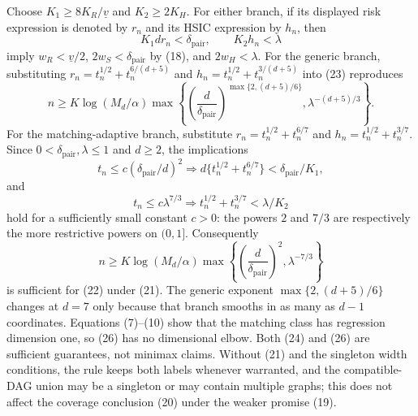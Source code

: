 Choose \(K_1\ge8K_R/\underline v\) and \(K_2\ge2K_H\). For either branch, if its displayed risk expression is denoted by \(r_n\) and its HSIC expression by \(h_n\), then
\[
 K_1d r_n<\delta_{\mathrm{pair}},
 \qquad K_2h_n<\lambda \tag{23}
\]
imply \(w_R<\underline v/2\), \(2w_S<\delta_{\mathrm{pair}}\) by (18), and \(2w_H<\lambda\). For the generic branch, substituting \(r_n=t_n^{1/2}+t_n^{6/(d+5)}\) and \(h_n=t_n^{1/2}+t_n^{3/(d+5)}\) into (23) reproduces
\[
 n\ge K\log(M_d/\alpha)
 \max\left\{
 \left(\frac d{\delta_{\mathrm{pair}}}\right)^{\max\{2,(d+5)/6\}},
 \lambda^{-(d+5)/3}
 \right\}. \tag{24}
\]
For the matching-adaptive branch, substitute \(r_n=t_n^{1/2}+t_n^{6/7}\) and \(h_n=t_n^{1/2}+t_n^{3/7}\). Since \(0<\delta_{\mathrm{pair}},\lambda\le1\) and \(d\ge2\), the implications
\[
 t_n\le c(\delta_{\mathrm{pair}}/d)^2
 \Longrightarrow d\{t_n^{1/2}+t_n^{6/7}\}<\delta_{\mathrm{pair}}/K_1,
\]
and
\[
 t_n\le c\lambda^{7/3}
 \Longrightarrow t_n^{1/2}+t_n^{3/7}<\lambda/K_2 \tag{25}
\]
hold for a sufficiently small constant \(c>0\): the powers \(2\) and \(7/3\) are respectively the more restrictive powers on \((0,1]\). Consequently
\[
 n\ge K\log(M_d/\alpha)
 \max\left\{
 \left(\frac d{\delta_{\mathrm{pair}}}\right)^2,
 \lambda^{-7/3}
 \right\} \tag{26}
\]
is sufficient for (22) under (21). The generic exponent \(\max\{2,(d+5)/6\}\) changes at \(d=7\) only because that branch smooths in as many as \(d-1\) coordinates. Equations (7)--(10) show that the matching class has regression dimension one, so (26) has no dimensional elbow. Both (24) and (26) are sufficient guarantees, not minimax claims. Without (21) and the singleton width conditions, the rule keeps both labels whenever warranted, and the compatible-DAG union may be a singleton or may contain multiple graphs; this does not affect the coverage conclusion (20) under the weaker promise (19).
